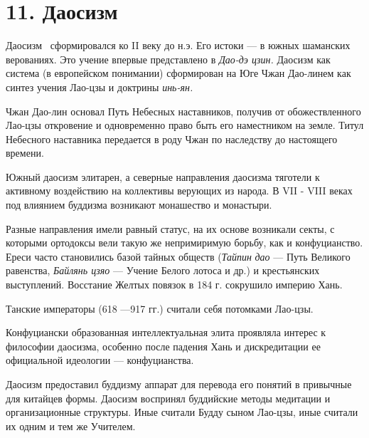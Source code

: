 \documentclass[twoside,a4paper]{article}
\begin{document}
\section[11. Даосизм]{ 11. Даосизм}
{
Даосизм \ сформировался ко \foreignlanguage{english}{II} веку до н.э. Его истоки — в южных шаманских верованиях. Это
учение впервые представлено в \textit{{\textquotedbl}Дао-дэ цзин{\textquotedbl}. }Даосизм как система (в европейском
понимании) сформирован на Юге Чжан Дао-линем\textit{ }как синтез учения Лао\nobreakdash-цзы и\textit{ }доктрины
\textit{инь-ян. }}

{
Чжан Дао-лин\textit{ }основал {\textquotedbl}Путь Небесных наставников{\textquotedbl}, получив от обожествленного
Лао-цзы откровение и одновременно право быть его наместником на земле. Титул {\textquotedbl} Небесного
наставника{\textquotedbl} передается в роду Чжан по наследству до настоящего времени. }

{
Южный даосизм элитарен, а северные направления даосизма тяготели к активному воздействию на коллективы верующих
{\textquotedbl}из народа{\textquotedbl}. В \foreignlanguage{english}{VII} - \foreignlanguage{english}{VIII} веках под
влиянием буддизма\textit{ }возникают монашество и монастыри. }

{
Разные направления имели равный статус, на их основе возникали секты, с которыми ортодоксы вели такую же непримиримую
борьбу, как и конфуцианство. {\textquotedbl}Ереси{\textquotedbl} часто становились базой тайных обществ
(\textit{Тайпин} \textit{дао} — {\textquotedbl}Путь Великого равенства{\textquotedbl}, \textit{Байлянь цзяо }—\textit{
}{\textquotedbl}Учение Белого лотоса{\textquotedbl} и др.) и крестьянских выступлений. Восстание {\textquotedbl}Желтых
повязок{\textquotedbl} в 184 г. сокрушило империю Хань. }

{
Танские императоры (618 —917 гг.) считали себя потомками Лао-цзы.}

{
Конфуциански образованная интеллектуальная элита проявляла интерес к философии даосизма, особенно после падения Хань и
дискредитации ее официальной идеологии — конфуцианства. }

{
Даосизм предоставил буддизму аппарат для перевода его понятий в привычные для китайцев формы. Даосизм воспринял
буддийские методы медитации и организационные структуры. Иные считали Будду сыном Лао-цзы, иные считали их одним и тем
же Учителем. }
\end{document}
